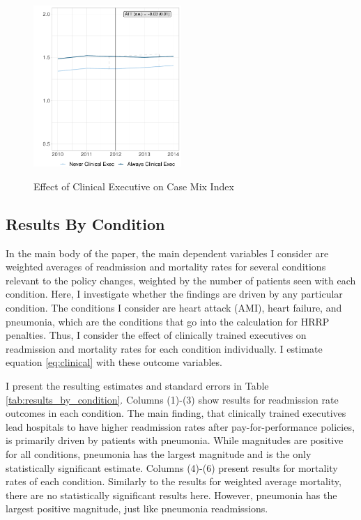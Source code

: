 \documentclass[12pt]{article}
\begin{document}
    \begin{figure}[ht!]
        \centering
        \caption{Effect of Clinical Executive on Case Mix Index}
        \includegraphics[width=0.5\textwidth]{Objects/cmi_md_nomd_synth_graph.pdf}
        \label{fig:main_cmi_clinical}
    \end{figure}


\subsection{Results By Condition}\label{app:condition}


In the main body of the paper, the main dependent variables I consider are weighted averages of readmission and mortality rates for several conditions relevant to the policy changes, weighted by the number of patients seen with each condition. Here, I investigate whether the findings are driven by any particular condition. The conditions I consider are heart attack (AMI), heart failure, and pneumonia, which are the conditions that go into the calculation for HRRP penalties. Thus, I consider the effect of clinically trained executives on readmission and mortality rates for each condition individually. I estimate equation \ref{eq:clinical} with these outcome variables. 

I present the resulting estimates and standard errors in Table \ref{tab:results_by_condition}. Columns (1)-(3) show results for readmission rate outcomes in each condition. The main finding, that clinically trained executives lead hospitals to have higher readmission rates after pay-for-performance policies, is primarily driven by patients with pneumonia. While magnitudes are positive for all conditions, pneumonia has the largest magnitude and is the only statistically significant estimate. Columns (4)-(6) present results for mortality rates of each condition. Similarly to the results for weighted average mortality, there are no statistically significant results here. However, pneumonia has the largest positive magnitude, just like pneumonia readmissions. 
\end{document}
